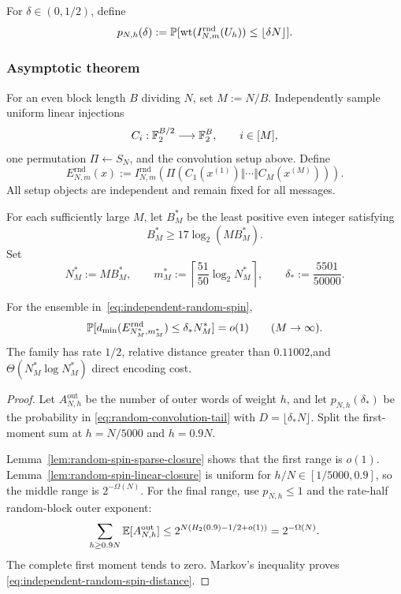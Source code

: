 For $\delta\in(0,1/2)$, define
\begin{equation}
  p_{N,h}(\delta)
  :=
  \mathbb P[
    \operatorname{wt}(I_{N,m}^{\mathrm{rnd}}(U_h))
    \le\lfloor\delta N\rfloor
  ].
  \label{eq:random-inner-slice-tail}
\end{equation}

\subsubsection{Asymptotic theorem}

For an even block length $B$ dividing $N$, set $M:=N/B$. Independently
sample uniform linear injections
\[
  C_i:\mathbb F_2^{B/2}\longrightarrow\mathbb F_2^B,
  \qquad i\in[M],
\]
one permutation $\Pi\gets S_N$, and the convolution setup above. Define
\begin{equation}
  E_{N,m}^{\mathrm{rnd}}(x)
  :=
  I_{N,m}^{\mathrm{rnd}}\!\left(
    \Pi(C_1(x^{(1)})\Vert\cdots\Vert C_M(x^{(M)}))
  \right).
  \label{eq:independent-random-spin}
\end{equation}
All setup objects are independent and remain fixed for all messages.

For each sufficiently large $M$, let $B_M^*$ be the least positive even
integer satisfying
\[
  B_M^*\ge17\log_2(MB_M^*).
\]
Set
\[
  N_M^*:=MB_M^*,
  \qquad
  m_M^*:=\left\lceil\frac{51}{50}\log_2N_M^*\right\rceil,
  \qquad
  \delta_*:=\frac{5501}{50000}.
\]

\begin{theorem}
\label{thm:independent-random-spin}
For the ensemble in~\eqref{eq:independent-random-spin},
\begin{equation}
  \mathbb P[
    d_{\min}(E_{N_M^*,m_M^*}^{\mathrm{rnd}})
    \le\delta_*N_M^*
  ]
  =o(1)
  \qquad(M\to\infty).
  \label{eq:independent-random-spin-distance}
\end{equation}
The family has rate $1/2$, relative distance greater than $0.11002$,\linebreak and
$\Theta(N_M^*\log N_M^*)$ direct encoding cost.
\end{theorem}

\begin{proof}
Let $A_{N,h}^{\mathrm{out}}$ be the number of outer words of weight $h$, and
let $p_{N,h}(\delta_*)$ be the probability in
\eqref{eq:random-convolution-tail} with
$D=\lfloor\delta_*N\rfloor$. Split the first-moment sum at
$h=N/5000$ and $h=0.9N$.

Lemma~\ref{lem:random-spin-sparse-closure} shows that the first range is
$o(1)$. Lemma~\ref{lem:random-spin-linear-closure} is uniform for
$h/N\in[1/5000,0.9]$, so the middle range is $2^{-\Omega(N)}$. For the final
range, use $p_{N,h}\le1$ and the rate-half random-block outer exponent:
\[
  \sum_{h\ge0.9N}\mathbb E[A_{N,h}^{\mathrm{out}}]
  \le
  2^{N(H_2(0.9)-1/2+o(1))}
  =2^{-\Omega(N)}.
\]
The complete first moment tends to zero. Markov's inequality proves
\eqref{eq:independent-random-spin-distance}.
\end{proof}

